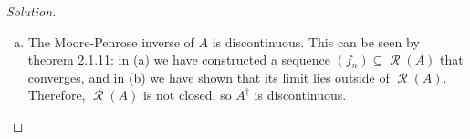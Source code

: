 \documentclass{article}
\theoremstyle{plain}
\theoremstyle{remark}
\newenvironment{solution}{\begin{proof}[Solution]\renewcommand\qedsymbol{}}{\end{proof}}
\newcommand{\Bb}{\mathbb}
\newcommand{\Cal}{\mathcal}
\newcommand\ZZ{\Bb Z}
\DeclarePairedDelimiter{\ang}{\langle}{\rangle}
\newcommand{\D}{^\dagger}
\DeclareMathOperator\Nul{\Cal N}
\DeclareMathOperator\Ran{\Cal R}
\begin{document}
\begin{solution}
\begin{enumerate}[(a)]
	\begin{align*}
		\ang{Au, v} &= \int_0^1 (Au)(y)\cdot v(y) \dd{y} \\
		&= \int_0^1 \int_0^y u(x) \dd{x} v(y) \dd{y} \\
		&= \int_0^1 \int_0^y u(x) v(y) \dd{x} \dd{y} \\
		&= \int_0^1 \int_x^1 u(x) v(y) \dd{y} \dd{x} \\ 
		&= \int_0^1 u(x) \int_x^1 v(y) \dd{y} \dd{x} \\
		&= \ang{u, A^* v}
	\end{align*}
where $v(x) = \int_x^1 v(y) \dd{y}$.  Therefore, we find
\begin{align*}
	(AA^* u)(x) = \int_0^x \int_y^1 u(z) \dd{z} \dd{y}.
\end{align*}
Now we solve the eigenequation. Firstly, note that $\Nul(A) = \qty{0}$, so let $\lambda^2 > 0$. Then we have
\begin{align}
	\int_0^x \int_y^1 u(z) \dd{z} \dd{y} &= \lambda^2 u(x) \\
	\int_x^1 u(z) \dd{z} &= \lambda^2 u'(x) \\
	- u(x) &= \lambda^2 u''(x). 
\end{align}
Furthermore, from (1) we infer $u(0) = 0$ while from (2) we infer $u'(1) = 0$. 
The general solution to (3) is given by $u(x) = a \cos(\lambda^{-1} x) + b \sin(\lambda^{-1} x)$. 
Plugging $u(0) = 0$ gives $a = 0$, and $u'(1) = 0$ gives
\[
b\lambda^{-1} \cos(\lambda^{-1}) = 0 \implies b = 0 \text{ or } \lambda^{-1} = \pi\qty(n - \frac12) \text{ for some $n \in \ZZ_{>0}$}.
\]

Our singular values are therefore $\frac{1}{(n - \frac12)\pi}$ ($n \in \ZZ_{>0}$) with right singular vectors $y_n(x) = \sqrt 2\sin((n - \frac12) \pi x)$. 
We now compute
\[
\ang{f, y_n} = \sqrt 2\int_{1/2}^1 \sin(\qty(n - \frac12) \pi x) \dd{x} = ...
\]

\item The Moore-Penrose inverse of $A$ is discontinuous. This can be seen by theorem 2.1.11: in (a) we have constructed a sequence $(f_n) \subseteq \Ran(A)$ that converges, and in (b) we have shown that its limit lies outside of $\Ran(A)$. Therefore, $\Ran(A)$ is not closed, so $A\D$ is discontinuous. 

\end{enumerate}
\end{solution}
\end{document}
